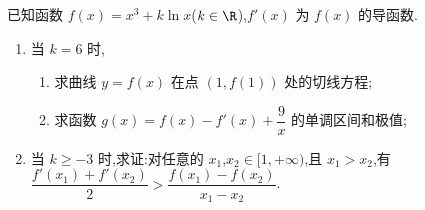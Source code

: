\begin{problem}
已知函数 \(f(x)=x^3+k\ln x\)(\(k\in\R\)),\(f'(x)\) 为 \(f(x)\) 的导函数.

\begin{enumerate}
\item 当 \(k=6\) 时,
\begin{enumerate}
\item 求曲线 \(y=f(x)\) 在点 \((1,f(1))\) 处的切线方程;
\item 求函数 \(g(x)=f(x)-f'(x)+\dfrac9x\) 的单调区间和极值;
\end{enumerate}
\item 当 \(k\ge-3\) 时,求证:对任意的 \(x_1\),\(x_2\in[1,+\infty)\),且 \(x_1>x_2\),有 \(\dfrac{f'(x_1)+f'(x_2)}{2}>\dfrac{f(x_1)-f(x_2)}{x_1-x_2}\).
\end{enumerate}
\end{problem}

